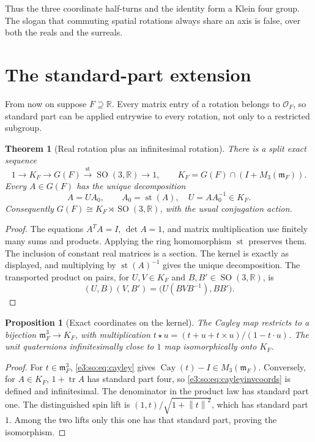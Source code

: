 \documentclass[11pt,letterpaper]{article}
\numberwithin{equation}{section}
\newtheorem{theorem}{Theorem}[section]
\newtheorem{proposition}[proposition]{Proposition}
\theoremstyle{definition}
\theoremstyle{remark}
\newcommand{\R}{\mathbb R}
\newcommand{\OO}{\mathcal O}
\newcommand{\mm}{\mathfrak m}
\newcommand{\st}{\operatorname{st}}
\newcommand{\SO}{\operatorname{SO}}
\newcommand{\cay}{\operatorname{Cay}}
\newcommand{\tr}{\operatorname{tr}}
\newcommand{\norm}[1]{\left\lVert#1\right\rVert}
\begin{document}
Thus the three coordinate half-turns and the identity form a Klein four group.
The slogan that commuting spatial rotations always share an axis is false,
over both the reals and the surreals.

\section{The standard-part extension}\label{e3:so:sec:standardpart}

From now on suppose \(F\supseteq\R\). Every matrix entry of a rotation belongs
to \(\OO_F\), so standard part can be applied entrywise to every rotation,
not only to a restricted subgroup.

\begin{theorem}[Real rotation plus an infinitesimal rotation]\label{e3:so:thm:split}
There is a split exact sequence
\begin{equation}\label{e3:so:eq:split}
 1\longrightarrow K_F\longrightarrow G(F)
 \xrightarrow{\ \st\ }\SO(3,\R)\longrightarrow1,
 \qquad K_F=G(F)\cap(I+M_3(\mm_F)).
\end{equation}
Every \(A\in G(F)\) has the unique decomposition
\begin{equation}\label{e3:so:eq:UR}
 A=UA_0,\qquad A_0=\st(A),\quad U=AA_0^{-1}\in K_F.
\end{equation}
Consequently \(G(F)\cong K_F\rtimes\SO(3,\R)\), with the usual conjugation action.
\end{theorem}
\begin{proof}
The equations \(A^TA=I\), \(\det A=1\), and matrix multiplication use finitely
many sums and products. Applying the ring homomorphism \(\st\) preserves them.
The inclusion of constant real matrices is a section. The kernel is exactly
as displayed, and multiplying by \(\st(A)^{-1}\) gives the unique decomposition.
The transported product on pairs, for \(U,V\in K_F\) and
\(B,B'\in\SO(3,\R)\), is
\[
 (U,B)(V,B')=\bigl(U(BVB^{-1}),BB'\bigr).
\]
\end{proof}

\begin{proposition}[Exact coordinates on the kernel]\label{e3:so:prop:kernelchart}
The Cayley map restricts to a bijection \(\mm_F^3\to K_F\), with multiplication
\(t\star u=(t+u+t\times u)/(1-t\cdot u)\). The unit quaternions infinitesimally
close to \(1\) map isomorphically onto \(K_F\).
\end{proposition}
\begin{proof}
For \(t\in\mm_F^3\), \cref{e3:so:eq:cayley} gives \(\cay(t)-I\in M_3(\mm_F)\).
Conversely, for \(A\in K_F\), \(1+\tr A\) has standard part four, so
\cref{e3:so:eq:cayleyinvcoords} is defined and infinitesimal. The denominator in the
product law has standard part one. The distinguished spin lift is
\((1,t)/\sqrt{1+\norm{t}^2}\), which has standard part \(1\). Among the two
lifts only this one has that standard part, proving the isomorphism.
\end{proof}
\end{document}
